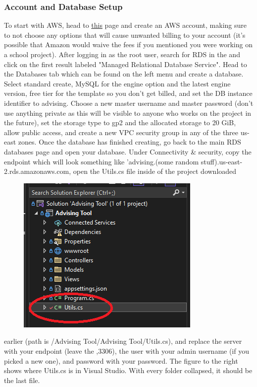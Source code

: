 \documentclass[12pt]{article}
\begin{document}
			\subsubsection{Account and Database Setup}
				To start with AWS, head to \href{https://aws.amazon.com}{this} page and create an AWS account, making sure to not choose any options that will cause unwanted billing to your account (it's possible that Amazon would waive the fees if you mentioned you were working on a school project). After logging in as the root user, search for RDS in the and click on the first result labeled "Managed Relational Database Service". Head to the Databases tab which can be found on the left menu and create a database. Select standard create, MySQL for the engine option and the latest engine version, free tier for the template so you don't get billed, and set the DB instance identifier to advising. Choose a new master username and master password (don't use anything private as this will be visible to anyone who works on the project in the future), set the storage type to gp2 and the allocated storage to 20 GiB, allow public access, and create a new VPC security group in any of the three us-east zones. Once the database has finished creating, go back to the main RDS databases page and open your database. Under Connectivity \& security, copy the endpoint which will look something like 'advising.(some random stuff).us-east-2.rds.amazonaws.com, open the Utils.cs file inside of the project downloaded 
				\begin{figure}
					\vspace*{-.6cm}\includegraphics[scale=.45]{utilslocation}
				\end{figure}earlier (path is /Advising Tool/Advising Tool/Utils.cs), and replace the server with your endpoint (leave the ,3306), the user with your admin username (if you picked a new one), and password with your password. The figure to the right shows where Utils.cs is in Visual Studio. With every folder collapsed, it should be the last file.
				
\end{document}
